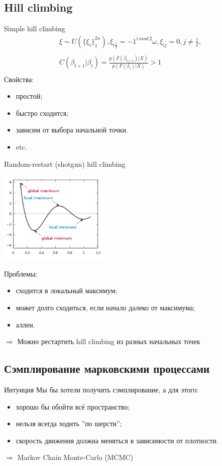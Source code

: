 \documentclass[14pt, fleqn, xcolor={dvipsnames, table}]{beamer}
\begin{document}
\subsection{Hill climbing}
\begin{frame}{Simple hill climbing}
$$\begin{array}{l}
\xi \sim U(\{\xi_i\}_1^{2n}), \xi_{i\frac{i}{2}} = -1^{i~mod~2}\omega, \xi_{ij} = 0, j \neq \frac{i}{2},\\
\\
C(\beta_{t+1}|\beta_t) = \frac{p(F(\beta_{t+1})|X)}{p(F(\beta_t)|X)} > 1 \\
\end{array}$$
Свойства:
\begin{itemize}
  \item простой;
  \item быстро сходится;
  \item зависим от выбора начальной точки.
  \item etc.
\end{itemize}
\end{frame}

\begin{frame}{Random-restart (shotgun) hill climbing}
\begin{center}
\includegraphics[width=0.4\textwidth]{hill_climb.png}
\end{center}
\footnotesize
Проблемы:
\begin{itemize}
  \item сходится в локальный максимум;
  \item может долго сходиться, если начало далеко от максимума;
  \item аллеи.
\end{itemize}
$\Rightarrow$ Можно рестартить hill climbing из разных начальных точек
\end{frame}

\subsection{Сэмплирование марковскими процессами}
\begin{frame}{Интуиция}
Мы бы хотели получить сэмплирование, а для этого:
\begin{itemize}
  \item хорошо бы обойти всё пространство;
  \item нельзя всегда ходить ''по шерсти'';
  \item скорость движения должна меняться в зависимости от плотности.
\end{itemize}
$\Rightarrow$ Markov Chain Monte-Carlo (MCMC)
\end{frame}
\end{document}
